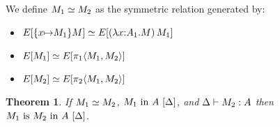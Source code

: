 \documentclass{article}
\theoremstyle{break}
\newtheorem{theorem}{Theorem}
\begin{document}
\newcommand{\headexpand}[2]{#1\simeq #2}

We define $\headexpand{\constructor_1}{\constructor_2}$ as the symmetric
relation generated by:
\begin{itemize}
\item 
$\headexpand{E[\substitute{\cvar}{\constructor_1}{\constructor}]}
  {E[\capply{(\cfunction{\cvar}{\kind_1}{\constructor})}{\constructor_1}]}$ %
\item 
$\headexpand{E[\constructor_1]}{E[\cpi{1}{\cpair{\constructor_1}{\constructor_2}}]}$
\item 
$\headexpand{E[\constructor_2]}{E[\cpi{2}{\cpair{\constructor_1}{\constructor_2}}]}$
\end{itemize}

\begin{theorem}
\label{thm:weakheadclosure}
If $\headexpand{\constructor_1}{\constructor_2}$,
${M_1}\mathrm{\ in\ }{A}\ [\Delta]$, and
$\Delta\vdash M_2 : A$ then
${M_1}\mathrm{\ is\ }{M_2}\mathrm{\ in\ }{A}\ [\Delta]$.
\end{theorem}
\end{document}
